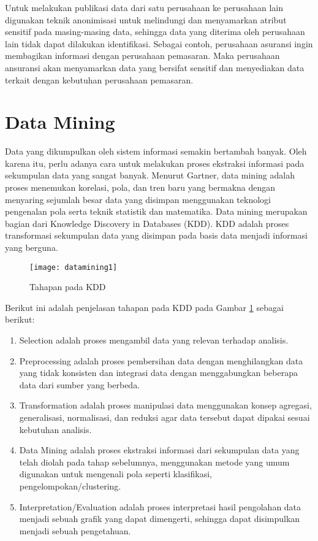 \par Untuk melakukan publikasi data dari satu perusahaan ke perusahaan lain digunakan teknik anonimisasi untuk melindungi dan menyamarkan atribut sensitif pada masing-masing data, sehingga data yang diterima oleh perusahaan lain tidak dapat dilakukan identifikasi. Sebagai contoh, perusahaan asuransi ingin membagikan informasi dengan perusahaan pemasaran. Maka perusahaan ansuransi akan menyamarkan data yang bersifat sensitif dan menyediakan data terkait dengan kebutuhan perusahaan pemasaran. 


\newpage
\section{Data Mining}
Data yang dikumpulkan oleh sistem informasi semakin bertambah banyak. Oleh karena itu, perlu adanya cara untuk melakukan proses ekstraksi informasi pada sekumpulan data yang sangat banyak. Menurut Gartner, data mining adalah proses menemukan korelasi, pola, dan tren baru yang bermakna dengan menyaring sejumlah besar data yang disimpan menggunakan teknologi pengenalan pola serta teknik statistik dan matematika. Data mining merupakan bagian dari Knowledge Discovery in Databases (KDD). KDD adalah proses transformasi sekumpulan data yang disimpan pada basis data menjadi informasi yang berguna.\\

\begin{figure}[H]
	\centering
	\texttt{[image: datamining1]}
	\caption{Tahapan pada KDD}
	\label{fig:datamining1}
\end{figure}

\noindent Berikut ini adalah penjelasan tahapan pada KDD pada Gambar \ref{fig:datamining1} sebagai berikut:

\begin{enumerate}
\item Selection adalah proses mengambil data yang relevan terhadap analisis.
\item Preprocessing adalah proses pembersihan data dengan menghilangkan data yang tidak konsisten dan integrasi data dengan menggabungkan beberapa data dari sumber yang berbeda.
\item Transformation adalah proses manipulasi data menggunakan konsep agregasi, generalisasi, normalisasi, dan reduksi agar data tersebut dapat dipakai sesuai kebutuhan analisis.
\item Data Mining adalah proses ekstraksi informasi dari sekumpulan data yang telah diolah pada tahap sebelumnya, menggunakan metode yang umum digunakan untuk mengenali pola seperti klasifikasi, pengelompokan/clustering.
\item Interpretation/Evaluation adalah proses interpretasi hasil pengolahan data menjadi sebuah grafik yang dapat dimengerti, sehingga dapat disimpulkan menjadi sebuah pengetahuan.
\end{enumerate}

